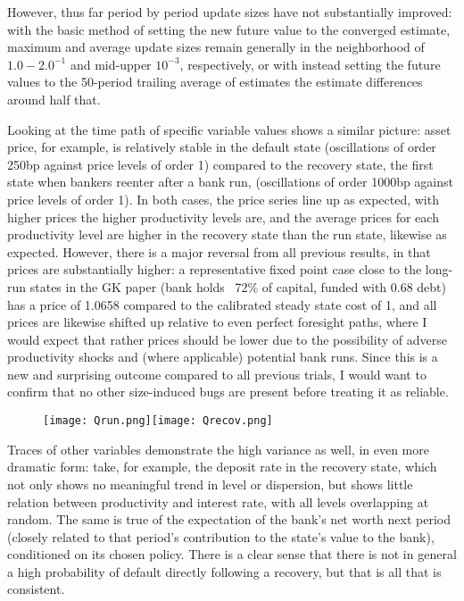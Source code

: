 \documentclass[english]{article}
\begin{document}
However, thus far period by period update sizes have not substantially improved: with the basic method 
of setting the new future value to the converged estimate, maximum and average update sizes remain 
generally in the neighborhood of $1.0-2.0^{-1}$ and mid-upper $10^{-3}$, respectively, or with instead setting the future values to the 50-period 
trailing average of estimates the estimate differences around half that. 



Looking at the time path of specific variable values shows a similar picture: asset price, for example, 
is relatively stable in the default state (oscillations of order 250bp against price levels of order 1) 
compared to the recovery state, the first state when bankers reenter after a bank run, (oscillations 
of order 1000bp against price levels of order 1). In both cases, the price series line up as expected, 
with higher prices the higher productivity levels are, and the average prices for each productivity level 
are higher in the recovery state than the run state, likewise as expected. However, there is a major reversal 
from all previous results, in that prices are substantially higher: a representative fixed point case close to the long-run
states in the GK paper (bank holds ~72\% of capital, funded with 0.68 debt) has a price of 1.0658 compared 
to the calibrated steady state cost of 1, and all prices are likewise shifted up relative to even perfect 
foresight paths, where I would expect that rather prices should be lower due to the possibility of 
adverse productivity shocks and (where applicable) potential bank runs. Since this is a new and surprising outcome 
compared to all previous trials, I would want to confirm that no other size-induced bugs are present before 
treating it as reliable.

\begin{figure}[H]
\centering
		\texttt{[image: Qrun.png]}\texttt{[image: Qrecov.png]}
\end{figure}

Traces of other variables demonstrate the high variance as well, in even more dramatic form: take, 
for example, the deposit rate in the recovery state, which not only shows no meaningful trend in level or 
dispersion, but shows little relation between productivity and interest rate, with all levels overlapping 
at random. The same is true of the expectation of the bank's net worth next period (closely related to 
that period's contribution to the state's value to the bank), conditioned on its chosen policy. There is 
a clear sense that there is not in general a high probability of default directly following a recovery, but 
that is all that is consistent.
\end{document}
